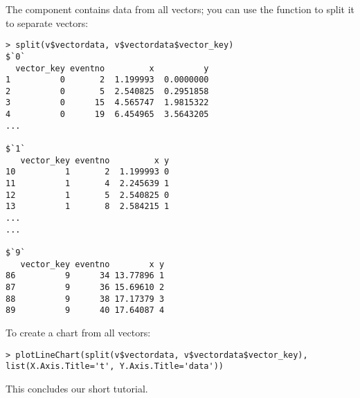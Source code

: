 The  component contains data from all vectors;
you can use the  function to split it to separate vectors:

\begin{verbatim}
> split(v$vectordata, v$vectordata$vector_key)
$`0`
  vector_key eventno         x          y
1          0       2  1.199993  0.0000000
2          0       5  2.540825  0.2951858
3          0      15  4.565747  1.9815322
4          0      19  6.454965  3.5643205
...

$`1`
   vector_key eventno         x y
10          1       2  1.199993 0
11          1       4  2.245639 1
12          1       5  2.540825 0
13          1       8  2.584215 1
...
...

$`9`
   vector_key eventno        x y
86          9      34 13.77896 1
87          9      36 15.69610 2
88          9      38 17.17379 3
89          9      40 17.64087 4
\end{verbatim}

To create a chart from all vectors:

\begin{verbatim}
> plotLineChart(split(v$vectordata, v$vectordata$vector_key), list(X.Axis.Title='t', Y.Axis.Title='data'))
\end{verbatim}


This concludes our short tutorial.
